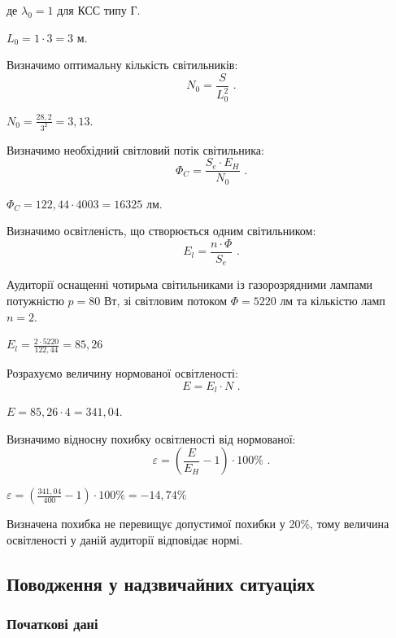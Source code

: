 \documentclass[a4paper,ukrainian,utf8,nocolumnsxix,floatsection,equationsection]{eskdtext}
\renewcommand\paragraph{\subsubsection}
\begin{document}
де $\lambda_0 = 1$ для КСС типу Г. 

$L_0  = 1 \cdot 3 = 3\text{ м} $.


Визначимо оптимальну кількість світильників:
\begin{equation}
	N_0 = \frac{S}{L_0^2}  \text{ .}
\end{equation}

$N_0  = \frac{28,2}{3^2} = 3,13 $.


Визначимо необхідний світловий потік світильника:
\begin{equation}
	\Phi_C = \frac{S_e \cdot E_H}{N_0}  \text{ .}
\end{equation}

$\Phi_C  = {122,44 \cdot 400}{3} = 16325 \text{ лм} $.


Визначимо освітленість, що створюється одним світильником:
\begin{equation}
	E_l = \frac{n \cdot \Phi}{S_e} \text{ .}
\end{equation}

Аудиторії оснащенні чотирьма світильниками із газорозрядними лампами потужністю $p=80$ Вт, зі світловим потоком $\Phi=5220$ лм та кількістю ламп $n=2$.

$E_l = \frac{2 \cdot 5220}{122,44} = 85,26$


Розрахуємо величину нормованої освітленості: 
\begin{equation}
	E = E_l \cdot N \text{ .}
\end{equation}

$E = 85,26 \cdot 4 = 341,04$.

Визначимо відносну похибку освітленості від нормованої:
\begin{equation}
	\varepsilon = \left( \frac{E}{E_H} - 1 \right) \cdot 100\% \text{ .}
\end{equation}

$\varepsilon = \left( \frac{341,04}{400} -1 \right) \cdot 100\% = -14,74\%$


Визначена похибка не перевищує допустимої похибки у 20\%, тому величина освітленості у даній аудиторії відповідає нормі.

\subsection{Поводження у надзвичайних ситуаціях}

\paragraph{Початкові дані}
\end{document}
